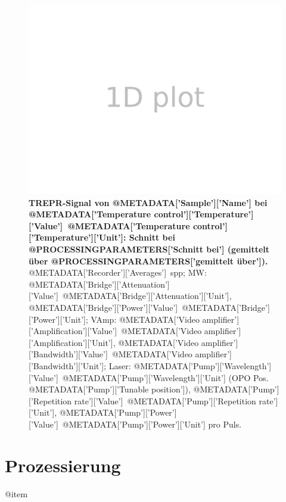 \documentclass{article}
\begin{document}
\begin{figure}[H]
	\includegraphics[width=\textwidth]{Plotter1D}
\caption{\textbf{TREPR-Signal von {@METADATA['Sample']['Name']} bei {@METADATA['Temperature control']['Temperature']['Value']}~{@METADATA['Temperature control']['Temperature']['Unit']}: Schnitt bei {@PROCESSINGPARAMETERS['Schnitt bei']} (gemittelt über {@PROCESSINGPARAMETERS['gemittelt über']}).} {@METADATA['Recorder']['Averages']}~spp; MW: {@METADATA['Bridge']['Attenuation']['Value']}~{@METADATA['Bridge']['Attenuation']['Unit']}, {@METADATA['Bridge']['Power']['Value']}~{@METADATA['Bridge']['Power']['Unit']}; VAmp: {@METADATA['Video amplifier']['Amplification']['Value']}~{@METADATA['Video amplifier']['Amplification']['Unit']}, {@METADATA['Video amplifier']['Bandwidth']['Value']}~{@METADATA['Video amplifier']['Bandwidth']['Unit']}; Laser: {@METADATA['Pump']['Wavelength']['Value']}~{@METADATA['Pump']['Wavelength']['Unit']} (OPO Pos. {@METADATA['Pump']['Tunable position']}), {@METADATA['Pump']['Repetition rate']['Value']}~{@METADATA['Pump']['Repetition rate']['Unit']}, {@METADATA['Pump']['Power']['Value']}~{@METADATA['Pump']['Power']['Unit']} pro Puls.}  
\end{figure}

\section*{Prozessierung}

	{@item}\\
\end{document}
